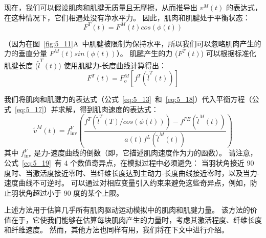 现在，我们可以假设肌肉和肌腱无质量且无摩擦，从而推导出 $v^M(t)$ 的表达式，在这种情况下，它们相遇处没有净水平力。
因此，肌肉和肌腱处于平衡状态：
\begin{equation}
	F^T (t) = F^M (t) cos( \phi (t) )
	\label{eq:5_17}
\end{equation}

（因为在图~\ref{fig:5_11}A~中肌腱被限制为保持水平，所以我们可以忽略肌肉产生的力的垂直分量 $F^M(t) sin(\phi(t))$）。
肌腱产生的力 ($F^T(t)$) 可以根据标准化肌腱长度 ($\tilde{l} ^T (t)$) 使用肌腱力-长度曲线计算得出：
%
\begin{equation}
	F^T (t) = F_o ^M [
		f^T
		(
			\tilde{l} ^T (t)
		)
	]
	\label{eq:5_18}
\end{equation}

我们将肌肉和肌腱力的表达式（公式~\ref{eq:5_13}~和~\ref{eq:5_18}）代入平衡方程（公式~\ref{eq:5_17}）并求解，得到肌肉速度的表达式：
%
\begin{equation}
	\tilde{v} ^M (t) = 
		f_\text{inv} ^V
		(
			\frac{
				f^T (\tilde{l} ^T (T) / cos( \phi (t) ))
				- f^{PE} (\tilde{l} ^M (t))
			}{
				a(t) f^L ( \tilde{l}^M (t) )
			}
		)
	\label{eq:5_19}
\end{equation}
%
其中 $f_\text{inv} ^V$ 是力-速度曲线的倒数（即，它描述肌肉速度作为力的函数）。
请注意，公式~\ref{eq:5_19}~有 4 个数值奇异点，在模拟过程中必须避免：
当羽状角接近 90 度时、当激活度接近零时、当纤维长度达到主动力-长度曲线接近零时，以及当力-速度曲线不可逆时。
可以通过对相应变量引入约束来避免这些奇异点，例如，防止羽状角超过小于 90 度的某个上限。


上述方法用于估算几乎所有肌肉驱动运动模拟中的肌肉和肌腱力量。
该方法的价值在于，它使我们能够在估算每块肌肉产生的力量时，考虑其激活程度、纤维长度和纤维速度。
然而，其他方法也同样有用，我们将在下文中进行介绍。





